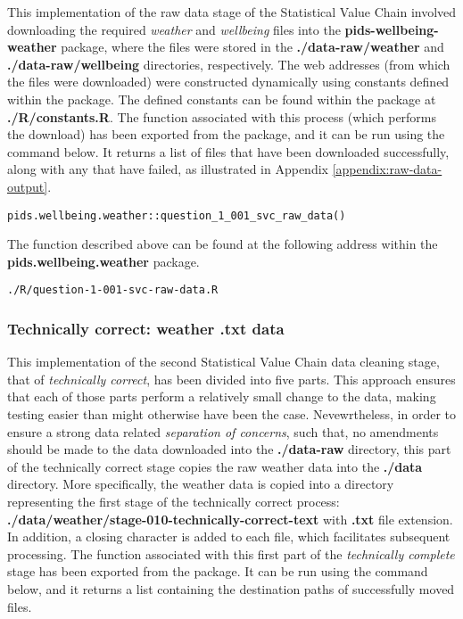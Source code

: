 \documentclass[12pt, oneside, openany]{book}
\begin{document}
This implementation of the raw data stage of the Statistical Value Chain involved downloading the required \emph{weather} and \emph{wellbeing} files into the \textbf{pids-wellbeing-weather} package, where the files were stored in the \textbf{./data-raw/weather} and \textbf{./data-raw/wellbeing} directories, respectively. The web addresses (from which the files were downloaded) were constructed dynamically using constants defined within the package. The defined constants can be found within the package at \textbf{./R/constants.R}. The function associated with this process (which performs the download) has been exported from the  package, and it can be run using the command below. It returns a list of files that have been downloaded successfully, along with any that have failed, as illustrated in Appendix \ref{appendix:raw-data-output}. 

\begin{verbatim}
pids.wellbeing.weather::question_1_001_svc_raw_data()
\end{verbatim}

The function described above can be found at the following address within the \textbf{pids.wellbeing.weather} package. 

\begin{verbatim}
./R/question-1-001-svc-raw-data.R
\end{verbatim}

\subsubsection*{Technically correct: weather .txt data}

This implementation of the second Statistical Value Chain data cleaning stage, that of \emph{technically correct}, has been divided into five parts. This approach ensures that each of those parts perform a relatively small change to the data, making testing easier than might otherwise have been the case. Nevewrtheless, in order to ensure a strong data related \emph{separation of concerns}, such that, no amendments should be made to the data downloaded into the \textbf{./data-raw} directory, this part of the technically correct stage copies the raw weather data into the \textbf{./data} directory. More specifically, the weather data is copied into a directory representing the first stage of the technically correct process: \textbf{./data/weather/stage-010-technically-correct-text} with \textbf{.txt} file extension. In addition, a closing character is added to each file, which facilitates subsequent processing. The function associated with this first part of the \emph{technically complete} stage has been exported from the package. It can be run using the command below, and it returns a list containing the destination paths of successfully moved files.
\end{document}
